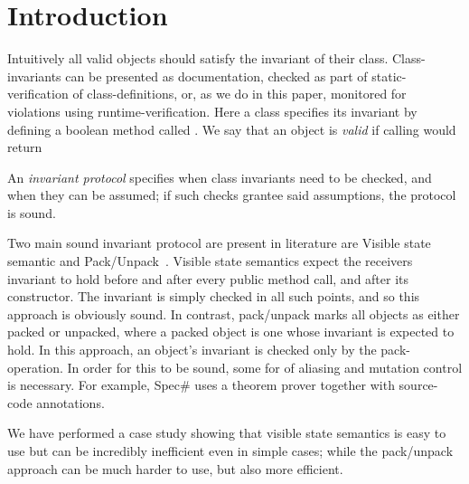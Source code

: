 \section{Introduction}
Intuitively all valid objects should satisfy the invariant of their class.
Class-invariants can be presented as documentation, checked as part of static-verification of class-definitions, or, as we do in this paper, monitored for violations using runtime-verification.
Here a class specifies its invariant by defining a boolean method called \Q@invariant@. We say that an object is \emph{valid} if calling \Q@invariant@ would return \Q@true@ 

An \emph{invariant protocol} specifies when class invariants need to be checked, and when they can be assumed; if such checks grantee said assumptions, the protocol is sound.


Two main sound invariant protocol are present in literature are Visible state semantic \cite{??} and Pack/Unpack~\cite{}.
Visible state semantics expect the receivers invariant to hold before and after every public method call, and after its constructor. The invariant is simply checked in all such points, and so this approach is obviously sound.
In contrast, pack/unpack marks all objects as either packed or unpacked, where a packed object is one whose invariant is expected to hold.
In this approach, an object's invariant is checked only by the pack-operation.
In order for this to be sound, some for of aliasing and mutation control is necessary. For example, Spec\# uses a theorem prover together with source-code annotations.



We have performed a case study showing that visible state semantics is easy to use but can be incredibly inefficient even in simple cases; while the pack/unpack approach can be much harder to use, but also more efficient.

